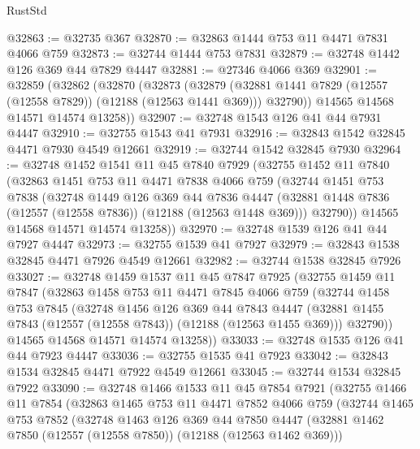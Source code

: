 \begin{lexlean}{RustStd}
\begin{coremodule}
@32863 := @32735 @367
@32870 := @32863 @1444 @753 @11 @4471 @7831 @4066 @759
@32873 := @32744 @1444 @753 @7831
@32879 := @32748 @1442 @126 @369 @44 @7829 @4447
@32881 := @27346 @4066 @369
@32901 := @32859
    (@32862
      (@32870
        (@32873
          (@32879 (@32881 @1441 @7829 (@12557 (@12558 @7829)) (@12188 (@12563 @1441 @369))) @32790))
        @14565
        @14568
        @14571
        @14574
        @13258))
@32907 := @32748 @1543 @126 @41 @44 @7931 @4447
@32910 := @32755 @1543 @41 @7931
@32916 := @32843 @1542 @32845 @4471 @7930 @4549 @12661
@32919 := @32744 @1542 @32845 @7930
@32964 := @32748
    @1452
    @1541
    @11
    @45
    @7840
    @7929
    (@32755
      @1452
      @11
      @7840
      (@32863
        @1451
        @753
        @11
        @4471
        @7838
        @4066
        @759
        (@32744
          @1451
          @753
          @7838
          (@32748
            @1449
            @126
            @369
            @44
            @7836
            @4447
            (@32881 @1448 @7836 (@12557 (@12558 @7836)) (@12188 (@12563 @1448 @369)))
            @32790))
        @14565
        @14568
        @14571
        @14574
        @13258))
@32970 := @32748 @1539 @126 @41 @44 @7927 @4447
@32973 := @32755 @1539 @41 @7927
@32979 := @32843 @1538 @32845 @4471 @7926 @4549 @12661
@32982 := @32744 @1538 @32845 @7926
@33027 := @32748
    @1459
    @1537
    @11
    @45
    @7847
    @7925
    (@32755
      @1459
      @11
      @7847
      (@32863
        @1458
        @753
        @11
        @4471
        @7845
        @4066
        @759
        (@32744
          @1458
          @753
          @7845
          (@32748
            @1456
            @126
            @369
            @44
            @7843
            @4447
            (@32881 @1455 @7843 (@12557 (@12558 @7843)) (@12188 (@12563 @1455 @369)))
            @32790))
        @14565
        @14568
        @14571
        @14574
        @13258))
@33033 := @32748 @1535 @126 @41 @44 @7923 @4447
@33036 := @32755 @1535 @41 @7923
@33042 := @32843 @1534 @32845 @4471 @7922 @4549 @12661
@33045 := @32744 @1534 @32845 @7922
@33090 := @32748
    @1466
    @1533
    @11
    @45
    @7854
    @7921
    (@32755
      @1466
      @11
      @7854
      (@32863
        @1465
        @753
        @11
        @4471
        @7852
        @4066
        @759
        (@32744
          @1465
          @753
          @7852
          (@32748
            @1463
            @126
            @369
            @44
            @7850
            @4447
            (@32881 @1462 @7850 (@12557 (@12558 @7850)) (@12188 (@12563 @1462 @369)))

\end{coremodule}
\end{lexlean}
